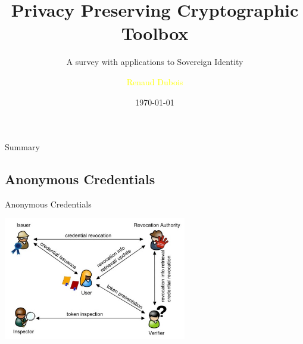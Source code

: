 \documentclass[aspectratio=43]{beamer}
\title{Privacy Preserving Cryptographic Toolbox } %
\subtitle{A survey with applications to Sovereign Identity}
\author[R. Dubois]{\textcolor{yellow}{Renaud Dubois}}
\institute[LIT]{
    \textcolor{white}{Ledger}%
    \\%
    \textcolor{white}{Innovation Team}%
} %
\date{\today}
\begin{document}
    
    \frame{\titlepage}
    \begin{frame}{Summary}
    
        \tableofcontents
        
   
    \end{frame} 
    
    
    \subsection{Anonymous Credentials}
  \begin{frame}{Anonymous Credentials}
  
  \begin{center}
  \includegraphics[width=8cm]{images/anonymouscredentials.jpg}
  \end{center}

  \end{frame}
\end{document}
